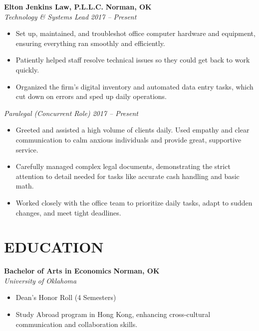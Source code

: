 \documentclass[11pt, letterpaper]{article}
\begin{document}
\noindent \textbf{Elton Jenkins Law, P.L.L.C.} \hfill \textbf{Norman, OK} \\
\textit{Technology \& Systems Lead} \hfill \textit{2017 -- Present}
\begin{itemize}[leftmargin=0.25in, label={$\bullet$}, itemsep=0pt, topsep=2pt]
    \item Set up, maintained, and troubleshot office computer hardware and equipment, ensuring everything ran smoothly and efficiently.
    \item Patiently helped staff resolve technical issues so they could get back to work quickly.
    \item Organized the firm's digital inventory and automated data entry tasks, which cut down on errors and sped up daily operations.
\end{itemize}

\vspace{4pt}

\noindent \textit{Paralegal (Concurrent Role)} \hfill \textit{2017 -- Present}
\begin{itemize}[leftmargin=0.25in, label={$\bullet$}, itemsep=0pt, topsep=2pt]
    \item Greeted and assisted a high volume of clients daily. Used empathy and clear communication to calm anxious individuals and provide great, supportive service.
    \item Carefully managed complex legal documents, demonstrating the strict attention to detail needed for tasks like accurate cash handling and basic math.
    \item Worked closely with the office team to prioritize daily tasks, adapt to sudden changes, and meet tight deadlines.
\end{itemize}

\section*{EDUCATION}

\noindent \textbf{Bachelor of Arts in Economics} \hfill \textbf{Norman, OK} \\
\textit{University of Oklahoma} 
\begin{itemize}[leftmargin=0.25in, label={$\bullet$}, itemsep=0pt, topsep=2pt]
    \item Dean's Honor Roll (4 Semesters)
    \item Study Abroad program in Hong Kong, enhancing cross-cultural communication and collaboration skills.
\end{itemize}
\end{document}
